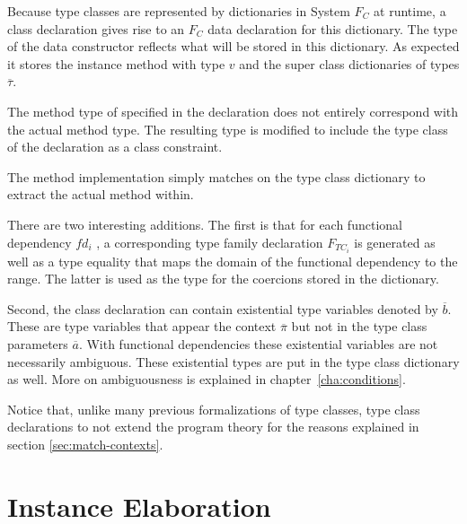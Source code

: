 Because type classes are represented by dictionaries in System $F_C$ at runtime,
a class declaration gives rise to an $F_C$ data declaration for this dictionary.
The type of the data constructor reflects what will be stored in this
dictionary.  As expected it stores the instance method with type $v$ and the
super class dictionaries of types $\overline{\tau}$.

The method type of specified in the declaration does not entirely correspond
with the actual method type. The resulting type is modified to include the type
class of the declaration as a class constraint.

The method implementation simply matches on the type class dictionary to extract
the actual method within.

There are two interesting additions. The first is that for each functional
dependency $fd_i$ , a corresponding type family declaration $F_{TC_i}$ is
generated as well as a type equality that maps the domain of the functional
dependency to the range. The latter is used as the type for the coercions stored
in the dictionary.

Second, the class declaration can contain existential type variables denoted by
$\overline{b}$. These are type variables that appear the context
$\overline{\pi}$ but not in the type class parameters $\overline{a}$. With
functional dependencies these existential variables are not necessarily
ambiguous. These existential types are put in the type class dictionary as well.
More on ambiguousness is explained in chapter~\ref{cha:conditions}.

Notice that, unlike many previous formalizations of type classes, type class
declarations to not extend the program theory for the reasons explained in
section \ref{sec:match-contexts}.

\section{Instance Elaboration}
\label{sec:instance-elaboration}

